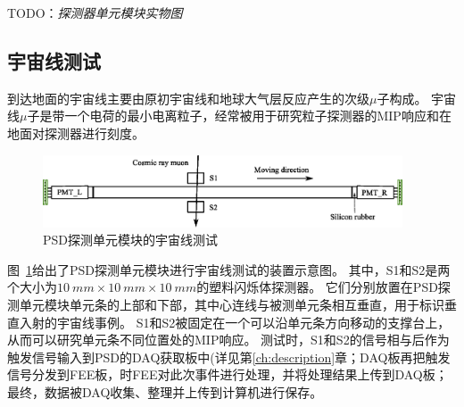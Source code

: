 TODO：\emph{探测器单元模块实物图}

\subsection{宇宙线测试}
\label{sec:dynamic_range:cosmic_ray}
到达地面的宇宙线主要由原初宇宙线和地球大气层反应产生的次级$\mu$子构成。
宇宙线$\mu$子是带一个电荷的最小电离粒子，经常被用于研究粒子探测器的MIP响应和在地面对探测器进行刻度。

\begin{figure}[htbp]
	\centering
	\includegraphics[width=0.95\textwidth]{chap/dynamic_range/fig/cosmic_test.eps}
	\caption{PSD探测单元模块的宇宙线测试}
	\label{fig:dynamic_range:cosmic_test}
\end{figure}
图~\ref{fig:dynamic_range:cosmic_test}给出了PSD探测单元模块进行宇宙线测试的装置示意图。
其中，S1和S2是两个大小为$\SI{10}{mm} \times \SI{10}{mm} \times \SI{10}{mm}$的塑料闪烁体探测器。
它们分别放置在PSD探测单元模块单元条的上部和下部，其中心连线与被测单元条相互垂直，用于标识垂直入射的宇宙线事例。
S1和S2被固定在一个可以沿单元条方向移动的支撑台上，从而可以研究单元条不同位置处的MIP响应。
测试时，S1和S2的信号相与后作为触发信号输入到PSD的DAQ获取板中(详见第\ref{ch:description}章；DAQ板再把触发信号分发到FEE板，时FEE对此次事件进行处理，并将处理结果上传到DAQ板；最终，数据被DAQ收集、整理并上传到计算机进行保存。


